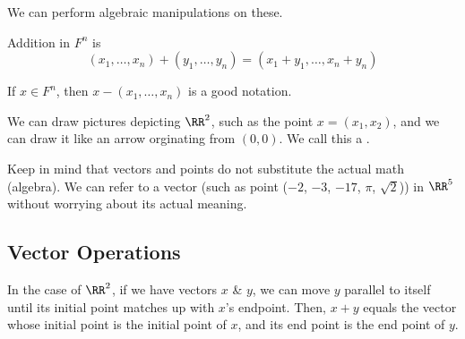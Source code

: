 We can perform algebraic manipulations on these.
\begin{example}
  Addition in $F^{n}$ is 
  \begin{equation*}
    (x_{1}, \dots, x_{n}) + (y_{1}, \dots, y_{n}) = (x_{1} + y_{1}, \dots, x_{n} + y_{n})
  \end{equation*}
\end{example}

If $x \in F^{n}$, then $x - (x_{1}, \dots, x_{n})$ is a good notation.

We can draw pictures depicting $\RR^{2}$, such as the point $x = (x_{1}, x_{2})$, and we can draw it like an arrow orginating from $(0, 0)$.
We call this a . 

\begin{figure}[H]
  \centering
\end{figure}

Keep in mind that vectors and points do not substitute the actual math (algebra). 
We can refer to a vector (such as point ($-2$, $-3$, $-17$, $\pi$, $\sqrt{2}$)) in $\RR^{5}$ without worrying about its actual meaning.

\subsection{Vector Operations}

In the case of $\RR^{2}$, if we have vectors $x$ \& $y$, we can move $y$ parallel to itself until its initial point matches up with $x$'s endpoint.
Then, $x + y$ equals the vector whose initial point is the initial point of $x$, and its end point is the end point of $y$.

\begin{figure}[H]
  \centering
\end{figure}

